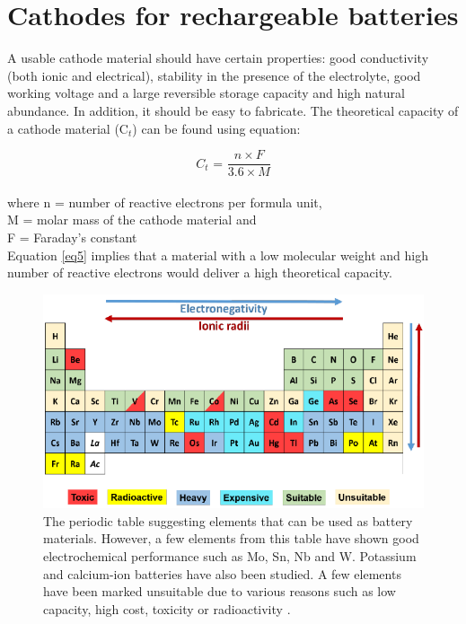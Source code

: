 \section{Cathodes for rechargeable batteries}
A usable cathode material should have certain properties: good conductivity (both ionic and electrical), stability in the presence of the electrolyte, good working voltage and a large reversible storage capacity and high natural abundance. In addition, it should be easy to fabricate. The theoretical capacity of a cathode material (C$_{t}$) can be found using equation:

\begin{equation} \label{eq5}
   C_{t} \text{ = } \frac{n \times F}{3.6 \times M}
\end{equation}\\
where n = number of reactive electrons per formula unit,\\
M = molar mass of the cathode material and\\
F = Faraday's constant\\
Equation \ref{eq5} implies that a material with a low molecular weight and high number of reactive electrons would deliver a high theoretical capacity.

\begin{figure}[h!]
\centering
\includegraphics[width=\textwidth]{Figures/chap1fig/pertab.pdf}
\caption{The periodic table suggesting elements that can be used as battery materials. However, a few elements from this table have shown good electrochemical performance such as Mo, Sn, Nb and W. Potassium and calcium-ion batteries have also been studied. A few elements have been marked unsuitable due to various reasons such as low capacity, high cost, toxicity or radioactivity \cite{liu_understanding_2016}.}
\label{Figures/chap1fig:pertab}
\end{figure}

